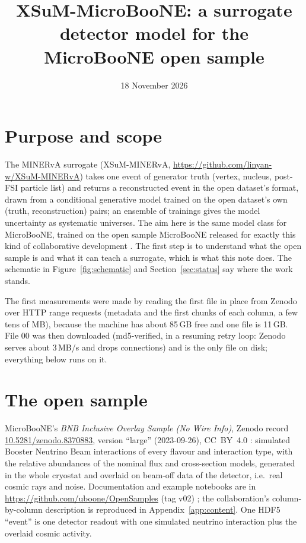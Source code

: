 \documentclass[10pt,letterpaper]{article}
\title{XSuM-MicroBooNE: a surrogate detector model for the MicroBooNE open sample}
\author{}
\date{18 November 2026}
\begin{document}
\maketitle


\tableofcontents

\section{Purpose and scope}

The MINERvA surrogate (XSuM-MINERvA, \url{https://github.com/linyan-w/XSuM-MINERvA}) takes one event of generator
truth (vertex, nucleus, post-FSI particle list) and returns a reconstructed event in the open dataset's format, drawn
from a conditional generative model trained on the open dataset's own (truth, reconstruction) pairs; an ensemble of
trainings gives the model uncertainty as systematic universes. The aim here is the same model class for MicroBooNE,
trained on the open sample MicroBooNE released for exactly this kind of collaborative development
\cite{cerati2023}. The first step is to understand what the open sample is and what it can teach a surrogate, which
is what this note does. The schematic in Figure~\ref{fig:schematic} and Section~\ref{sec:status} say where the work
stands.

The first measurements were made by reading the first file in place from Zenodo over HTTP range requests (metadata
and the first chunks of each column, a few tens of MB), because the machine has about 85\,GB free and one file is
11\,GB. File 00 was then downloaded (md5-verified, in a resuming retry loop: Zenodo serves about 3\,MB/s and drops
connections) and is the only file on disk; everything below runs on it.

\section{The open sample}\label{sec:sample}

MicroBooNE's \emph{BNB Inclusive Overlay Sample (No Wire Info)}, Zenodo record
\href{https://doi.org/10.5281/zenodo.8370883}{10.5281/zenodo.8370883}, version ``large'' (2023-09-26), CC~BY~4.0
\cite{zenodo8370883}: simulated Booster Neutrino Beam interactions of every flavour and interaction type, with the
relative abundances of the nominal flux and cross-section models, generated in the whole cryostat and overlaid on
beam-off data of the detector, i.e.\ real cosmic rays and noise. Documentation and example notebooks are in
\url{https://github.com/uboone/OpenSamples} (tag v02) \cite{opensamples}; the collaboration's column-by-column
description is reproduced in Appendix~\ref{app:content}. One HDF5 ``event'' is one detector readout with one
simulated neutrino interaction plus the overlaid cosmic activity.
\end{document}

